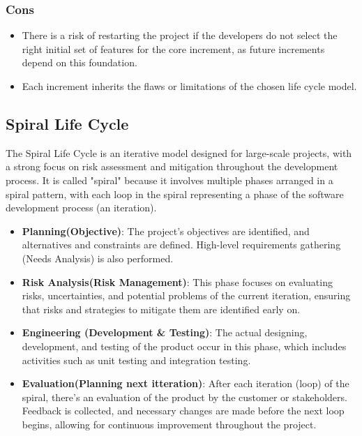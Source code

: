 \subsubsection{Cons}
\begin{itemize}
    \item There is a risk of restarting the project if the developers do not select the right initial set of features for the
core increment, as future increments depend on this foundation.
    \item Each increment inherits the flaws or limitations of the chosen life cycle model.
\end{itemize}

\vspace{1cm}
\subsection{Spiral Life Cycle} The Spiral Life Cycle is an iterative model designed for large-scale projects, with a strong
focus on risk assessment and mitigation throughout the development process. It is called "spiral" because it involves multiple
phases arranged in a spiral pattern, with each loop in the spiral representing a phase of the software development process
(an iteration).

\begin{itemize} 
    \item \textbf{Planning(Objective)}: The project’s objectives are identified, and alternatives and constraints are defined. 
High-level requirements gathering (Needs Analysis) is also performed.
    \item \textbf{Risk Analysis(Risk Management)}: This phase focuses on evaluating risks, uncertainties, and potential problems of the current
iteration, ensuring that risks and strategies to mitigate them are identified early on.
    \item \textbf{Engineering (Development \& Testing)}: The actual designing, development, and testing of the product occur in
this phase, which includes activities such as unit testing and integration testing.
    \item \textbf{Evaluation(Planning next itteration)}: After each iteration (loop) of the spiral, there’s an evaluation of the product by the customer
or stakeholders. Feedback is collected, and necessary changes are made before the next loop begins, allowing for continuous
improvement throughout the project.
\end{itemize}
\begin{center}
\end{center}
\vspace{1cm}
